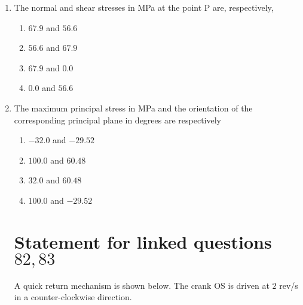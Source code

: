 \documentclass[journal,12pt,twocolumn]{IEEEtran}
\theoremstyle{remark}
\begin{document}
\begin{enumerate}[start=69]
                        \item The normal and shear stresses in MPa at the point P are, respectively,
                        \begin{enumerate}
                            \item $67.9$ and $56.6$
                            \item $56.6$ and $67.9$
                            \item $67.9$ and $0.0$
                            \item $0.0$ and $56.6$
                        \end{enumerate}
                        \item  The maximum principal stress in MPa and the orientation of the corresponding principal plane in degrees are respectively
                            \begin{enumerate}
                               \item  $-32.0$ and $-29.52 $
                               \item  $100.0$ and $60.48 $
                               \item  $32.0$ and $60.48$ 
                               \item  $100.0$ and $-29.52$
                            \end{enumerate}
                        \section{Statement for linked questions$82 , 83$}
                          A quick return mechanism is shown below. The crank OS is driven at $2$ rev/s in a counter-clockwise direction.
\end{enumerate}
\end{document}
